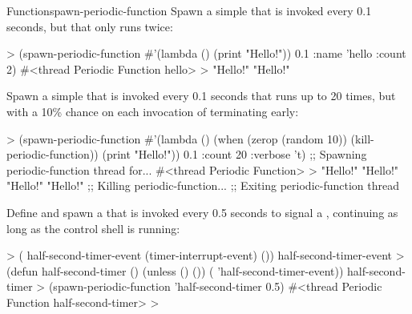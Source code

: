 \documentclass[10pt,twoside,english,pdftex]{article}
\begin{document}
\begin{functiondoc}{Function}{spawn-periodic-function}
\fnexamples 
Spawn a simple  that is invoked every 0.1 seconds,
but that only runs twice:
%
\W\supp
\begin{example}
  > (spawn-periodic-function #'(lambda () (print "Hello!")) 0.1 
      :name 'hello
      :count 2)
  #<thread Periodic Function hello>
  >
  "Hello!" 
  "Hello!" 
\end{example}
%
%
%
Spawn a simple  that is invoked every 0.1 seconds
that runs up to 20 times, but with a 10\% chance on each invocation of
terminating early:
%
\W\supp\notpretop
\begin{example}
  > (spawn-periodic-function 
       #'(lambda ()
           (when (zerop (random 10))
             (kill-periodic-function))
           (print "Hello!")) 
       0.1
       :count 20
       :verbose 't)
  ;; Spawning periodic-function thread for...
  #<thread Periodic Function>
  >
  "Hello!" 
  "Hello!" 
  "Hello!" 
  "Hello!" 
  ;; Killing periodic-function...
  ;; Exiting periodic-function thread
\end{example}
%
%
%
%
%
%
Define and spawn a  that is invoked every 0.5 seconds
to signal a , continuing as long as
the control shell is running:
%
\W\supp\notpretop
\begin{example}
  > ( half-second-timer-event (timer-interrupt-event)
      ())
  half-second-timer-event
  > (defun half-second-timer ()
      (unless ()
        ())
      ( 'half-second-timer-event))
  half-second-timer
  > (spawn-periodic-function 'half-second-timer 0.5)
  #<thread Periodic Function half-second-timer>
  >
\end{example}

\end{functiondoc}

\end{document}
